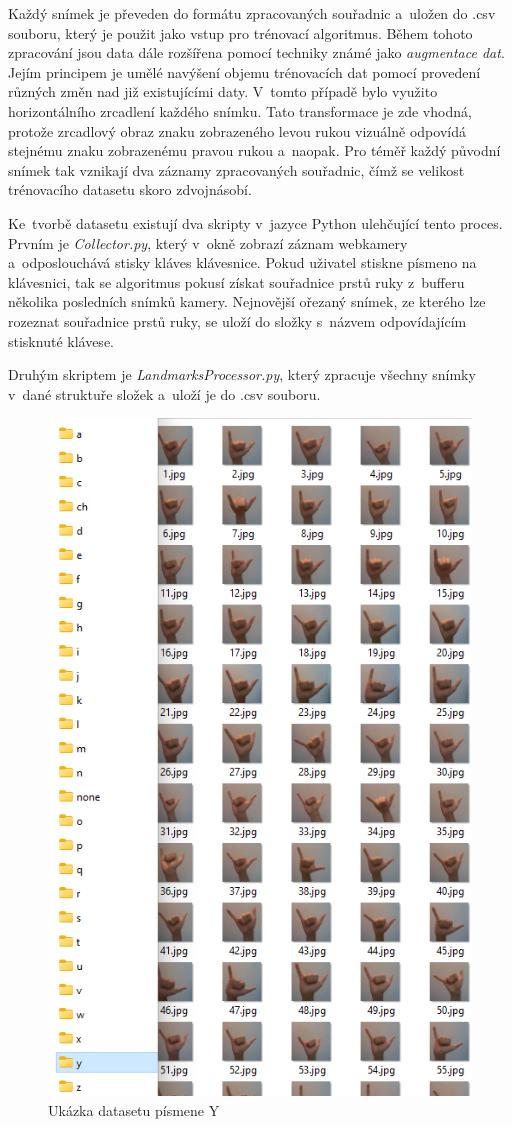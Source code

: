 \documentclass[
  master,
  program=ainfvs,
  biblatex,
  figures=true,
  tables=false,
  sourcecodes=true,
  glossaries,
  index
]{kidiplom}
\begin{document}
            Každý snímek je převeden do formátu zpracovaných souřadnic a~uložen do .csv souboru, který je použit jako vstup pro trénovací algoritmus. Během tohoto zpracování jsou data dále rozšířena pomocí techniky známé jako \emph{augmentace dat}. Jejím principem je umělé navýšení objemu trénovacích dat pomocí provedení různých změn nad již existujícími daty. V~tomto případě bylo využito horizontálního zrcadlení každého snímku. Tato transformace je zde vhodná, protože zrcadlový obraz znaku zobrazeného levou rukou vizuálně odpovídá stejnému znaku zobrazenému pravou rukou a~naopak. Pro téměř každý původní snímek tak vznikají dva záznamy zpracovaných souřadnic, čímž se velikost trénovacího datasetu skoro zdvojnásobí.

            Ke~tvorbě datasetu existují dva skripty v~jazyce Python ulehčující tento proces. Prvním je \emph{Collector.py}, který v~okně zobrazí záznam webkamery a~odposlouchává stisky kláves klávesnice. Pokud uživatel stiskne písmeno na klávesnici, tak se algoritmus pokusí získat souřadnice prstů ruky z~bufferu několika posledních snímků kamery. Nejnovější ořezaný snímek, ze kterého lze rozeznat souřadnice prstů ruky, se uloží do složky s~názvem odpovídajícím stisknuté klávese. 
            
            Druhým skriptem je \emph{LandmarksProcessor.py}, který zpracuje všechny snímky v~dané struktuře složek a~uloží je do .csv souboru.


         \begin{figure}[H]
            \centering
            \includegraphics[width=0.55\columnwidth]{graphics/dataset.png}
            \caption{Ukázka datasetu písmene Y}
            \label{dataset}
        \end{figure}
           
\end{document}
